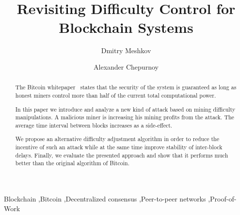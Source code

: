 \documentclass[number,preprint,review]{elsarticle}
\begin{document}
\begin{frontmatter}



\title{Revisiting Difficulty Control for Blockchain Systems}



\author[iohk]{Dmitry Meshkov}
\address[iohk]{IOHK Research}

\author[iohk]{Alexander Chepurnoy}
\address[iohk]{IOHK Research}

\begin{abstract}

The Bitcoin whitepaper~\cite{Nakamoto2008} states that the security of the system is guaranteed as long as honest miners control more than half of the current total computational power.

In this paper we introduce and analyze a new kind of attack based on mining difficulty manipulations. A malicious miner is increasing his mining profits from the attack. The average time interval between blocks increases as a side-effect.

We propose an alternative difficulty adjustment algorithm in order to reduce the incentive of such an attack while at the same time improve stability of inter-block delays. Finally, we evaluate the presented approach and show that it performs much better than the original algorithm of Bitcoin.

\end{abstract}

\begin{keyword}
Blockchain \sep Bitcoin \sep Decentralized consensus \sep Peer-to-peer networks \sep Proof-of-Work
\end{keyword}

\end{frontmatter}
\end{document}
